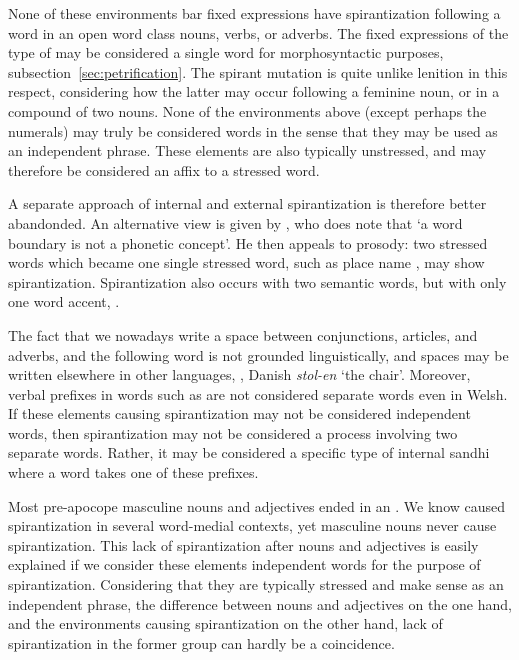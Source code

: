 None of these environments bar fixed expressions have spirantization following a word in an open word class \ie nouns, verbs, or adverbs.
The fixed expressions of the type of  may be considered a single word for morphosyntactic purposes, \cf subsection~\ref{sec:petrification}.
The spirant mutation is quite unlike lenition in this respect, considering how the latter may occur \eg following a feminine noun, or in a compound of two nouns. None of the environments above (except perhaps the numerals) may truly be considered words in the sense that they may be used as an independent phrase.
These elements are also typically unstressed, and may therefore be considered an affix to a stressed word.

A separate approach of internal and external spirantization is therefore better abandonded. An alternative view is given by \textcite[126--129]{koch_neo-brittonic_1989}, who does note that `a word boundary is not a phonetic concept'.
He then appeals to prosody: two stressed words which became one single stressed word, such as place name , may show spirantization.
Spirantization also occurs with two semantic words, but with only one word accent, \eg {}.

The fact that we nowadays write a space between conjunctions, articles, and adverbs, \etc and the following word is not grounded linguistically, and spaces may be written elsewhere in other languages, \eg {}, Danish \textit{stol-en} `the chair'.
Moreover, verbal prefixes in words such as  are not considered separate words even in Welsh.
If  these elements causing spirantization may not be considered independent words, then spirantization may not be considered a process involving two separate words.
Rather, it may be considered a specific type of internal sandhi where a word takes one of these prefixes.

Most pre-apocope masculine  nouns and adjectives ended in an .
We know  caused spirantization in several word-medial contexts, yet masculine nouns never cause spirantization.
This lack of spirantization after nouns and adjectives is easily explained if we consider these elements independent words for the purpose of spirantization.
Considering that they are typically stressed and make sense as an independent phrase, the difference between nouns and adjectives on the one hand, and the environments causing spirantization on the other hand, lack of spirantization in the former group can hardly be a coincidence.

